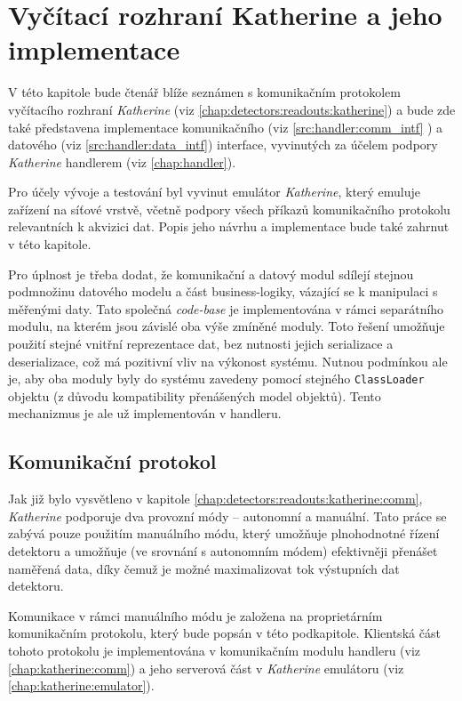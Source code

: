

\chapter{Vyčítací rozhraní Katherine a jeho implementace}\label{chap:katherine}
V této kapitole bude čtenář blíže seznámen s komunikačním protokolem vyčítacího rozhraní \textit{Katherine} (viz \ref{chap:detectors:readouts:katherine}) a bude zde také představena implementace komunikačního (viz \ref{src:handler:comm_intf} ) a datového (viz \ref{src:handler:data_intf}) interface, vyvinutých za účelem podpory \textit{Katherine} handlerem (viz \ref{chap:handler}). 

Pro účely vývoje a testování byl vyvinut emulátor \textit{Katherine}, který emuluje zařízení na síťové vrstvě, včetně podpory všech příkazů komunikačního protokolu relevantních k akvizici dat. Popis jeho návrhu a implementace bude také zahrnut v této kapitole.

Pro úplnost je třeba dodat, že komunikační a datový modul sdílejí stejnou podmnožinu datového modelu a část business-logiky, vázající se k manipulaci s měřenými daty. Tato společná \textit{code-base} je implementována v rámci separátního modulu, na kterém jsou závislé oba výše zmíněné moduly. Toto řešení umožňuje použití stejné vnitřní reprezentace dat, bez nutnosti jejich serializace a deserializace, což má pozitivní vliv na výkonost systému. Nutnou podmínkou ale je, aby oba moduly byly do systému zavedeny pomocí stejného \texttt{ClassLoader} objektu (z důvodu kompatibility přenášených model objektů). Tento mechanizmus je ale už implementován v handleru.

\section{Komunikační protokol}\label{chap:katherine:protocol}
Jak již bylo vysvětleno v kapitole \ref{chap:detectors:readouts:katherine:comm}, \textit{Katherine} podporuje dva provozní módy -- autonomní a manuální. Tato práce se zabývá pouze použitím manuálního módu, který umožňuje plnohodnotné řízení detektoru a umožňuje (ve srovnání s autonomním módem) efektivněji přenášet naměřená data, díky čemuž je možné maximalizovat tok výstupních dat detektoru.

Komunikace v rámci manuálního módu je založena na proprietárním komunikačním protokolu, který bude popsán v této podkapitole. Klientská část tohoto protokolu je implementována v komunikačním modulu handleru (viz \ref{chap:katherine:comm}) a jeho serverová část v \textit{Katherine} emulátoru (viz \ref{chap:katherine:emulator}).

